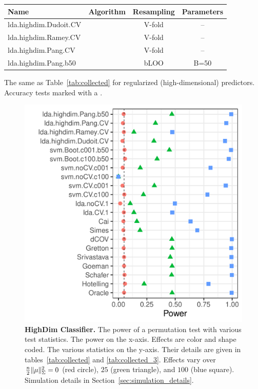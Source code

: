 \documentclass[oupdraft]{bio}
\begin{document}
\begin{tcolorbox}
	\centering
	\footnotesize
	\begin{tabular}{l|c|c|c}
		Name & Algorithm & Resampling &  Parameters\\ 
		\hline
		\hline
		\cue lda.highdim.Dudoit.CV & \cite{dudoit_comparison_2002} & V-fold & -- \\ 
		\cue lda.highdim.Ramey.CV & \cite{ramey_high-dimensional_2016} & V-fold & -- \\ 
		\cue lda.highdim.Pang.CV & \cite{pang_shrinkage-based_2009} & V-fold & -- \\ 
		\cue lda.highdim.Pang.b50 & \cite{pang_shrinkage-based_2009} & bLOO 	 & B=50 \\ 
	\end{tabular} 
	\captionsetup{type=table}
	\caption{\footnotesize
		The same as Table~\ref{tab:collected} for regularized (high-dimensional) predictors. 
		Accuracy tests marked with a \cue.
	} 
	\label{tab:collected_3}
\end{tcolorbox}


\begin{figure}[ht]
	\centering
	\includegraphics[width=0.5\columnwidth]{"file14"}
	\caption{\textbf{HighDim Classifier.} 
		The power of a permutation test with various test statistics. 
		The power on the x-axis. 
		Effects are color and shape coded. 
		The various statistics on the y-axis. 
		Their details are given in tables~\ref{tab:collected} and \ref{tab:collected_3}. 
		Effects vary over $\frac{n}{2}\Vert \mu \Vert^2_\Sigma=0$ (red circle), $25$ (green triangle), and $100$ (blue square). 
		Simulation details in Section~\ref{sec:simulation_details}.
	} 
	\label{fig:highdim}
\end{figure}
\end{document}
